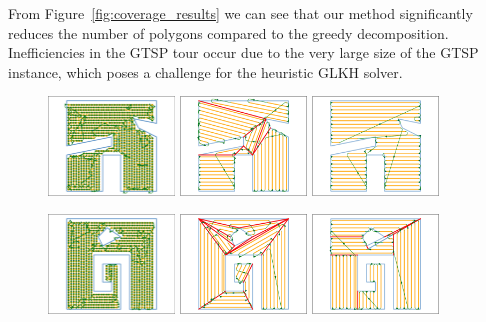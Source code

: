 \documentclass[../main.tex]{subfiles}
\begin{document}
From Figure~\ref{fig:coverage_results} we can see that our method significantly reduces the number of polygons compared to the greedy decomposition. Inefficiencies in the GTSP tour occur due to the very large size of the GTSP instance, which poses a challenge for the heuristic GLKH solver.

\begin{figure}
		\centering
		\includegraphics[width=0.3\textwidth]{img/chapter_3/point_10_coverage.png}%
		\includegraphics[width=0.3\textwidth]{img/chapter_3/greedy_10_coverage.pdf}%
		\includegraphics[width=0.3\textwidth]{img/chapter_3/min_10_coverage.pdf}

		\includegraphics[width=0.3\textwidth]{img/chapter_3/point_11_coverage.png}%
		\includegraphics[width=0.3\textwidth]{img/chapter_3/greedy_11_coverage.pdf}%
		\includegraphics[width=0.3\textwidth]{img/chapter_3/min_11_coverage.pdf}


\end{figure}
\end{document}
